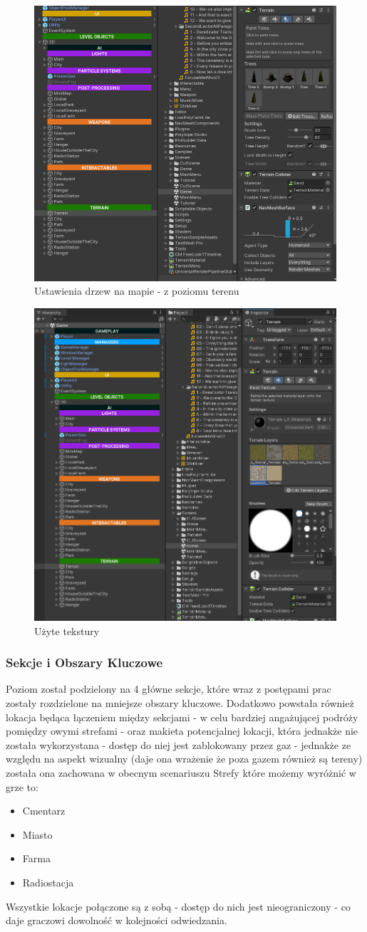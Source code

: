 \begin{figure}[h!]
    \centering
    \includegraphics[width=0.65\linewidth]{Images/terrain.png}
    \caption{Ustawienia drzew na mapie - z poziomu terenu}
\end{figure}
\begin{figure}[h!]
    \centering
    \includegraphics[width=0.65\linewidth]{Images/image.png}
    \caption{Użyte tekstury}
\end{figure}
\newpage
\subsubsection{Sekcje i Obszary Kluczowe}
Poziom został podzielony na 4 główne sekcje, które wraz z postępami prac zostały rozdzielone na mniejsze obszary kluczowe.
Dodatkowo powstała również lokacja będąca łączeniem między sekcjami - w celu bardziej angażującej podróży pomiędzy owymi strefami - oraz makieta potencjalnej lokacji, która jednakże nie została wykorzystana - dostęp do niej jest zablokowany przez gaz - jednakże ze względu na aspekt wizualny (daje ona wrażenie że poza gazem również są tereny) została ona zachowana w obecnym scenariuszu
Strefy które możemy wyróżnić w grze to:
\begin{itemize}
    \item Cmentarz
    \item Miasto
    \item Farma
    \item Radiostacja
\end{itemize}
Wszystkie lokacje połączone są z sobą - dostęp do nich jest nieograniczony - co daje graczowi dowolność w kolejności odwiedzania.

